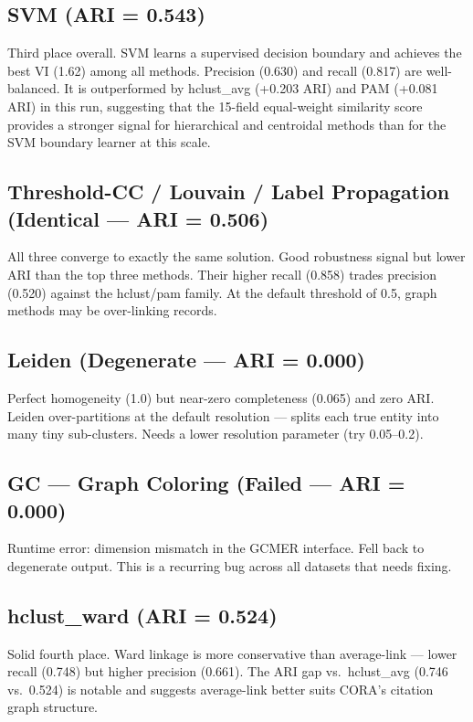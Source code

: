 \documentclass[11pt, a4paper]{article}
\begin{document}
\subsection*{SVM (ARI = 0.543)}
Third place overall. SVM learns a supervised decision boundary and achieves the best VI (1.62)
among all methods. Precision (0.630) and recall (0.817) are well-balanced. It is outperformed by
hclust\_avg (+0.203 ARI) and PAM (+0.081 ARI) in this run, suggesting that the 15-field equal-weight
similarity score provides a stronger signal for hierarchical and centroidal methods than for the
SVM boundary learner at this scale.

\subsection*{Threshold-CC / Louvain / Label Propagation (Identical --- ARI = 0.506)}
All three converge to exactly the same solution. Good robustness signal but lower ARI than
the top three methods. Their higher recall (0.858) trades precision (0.520) against the
hclust/pam family. At the default threshold of 0.5, graph methods may be over-linking records.

\subsection*{Leiden (Degenerate --- ARI = 0.000)}
Perfect homogeneity (1.0) but near-zero completeness (0.065) and zero ARI. Leiden
over-partitions at the default resolution --- splits each true entity into many tiny sub-clusters.
Needs a lower resolution parameter (try 0.05--0.2).

\subsection*{GC --- Graph Coloring (Failed --- ARI = 0.000)}
Runtime error: dimension mismatch in the GCMER interface. Fell back to degenerate output.
This is a recurring bug across all datasets that needs fixing.

\subsection*{hclust\_ward (ARI = 0.524)}
Solid fourth place. Ward linkage is more conservative than average-link --- lower recall (0.748)
but higher precision (0.661). The ARI gap vs.\ hclust\_avg (0.746 vs.\ 0.524) is notable and
suggests average-link better suits CORA's citation graph structure.
\end{document}
